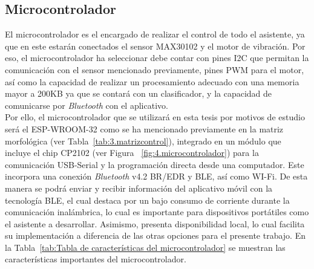 \subsection{Microcontrolador}
    El microcontrolador es el encargado de realizar el control de todo el asistente, ya que en este estarán conectados el sensor MAX30102 y el motor de vibración. Por eso, el microcontrolador ha seleccionar debe contar con pines I2C que permitan la comunicación con el sensor mencionado previamente, pines PWM para el motor, así como la capacidad de realizar un procesamiento adecuado con una memoria mayor a 200KB ya que se contará con un clasificador, y la capacidad de comunicarse por \textit{Bluetooth} con el aplicativo.\\
    
    Por ello, el microcontrolador que se utilizará en esta tesis por motivos de estudio será el ESP-WROOM-32 como se ha mencionado previamente en la matriz morfológica (ver Tabla~\ref{tab:3.matrizcontrol}), integrado en un módulo que incluye el chip CP2102 (ver Figura ~\ref{fig:4.microcontrolador}) para la comunicación USB-Serial y la programación directa desde una computador. Este incorpora una conexión \textit{Bluetooth} v4.2 BR/EDR y BLE, así como WI-Fi. De esta manera se podrá enviar y recibir información del aplicativo móvil con la tecnología \ac{BLE}, el cual destaca por un bajo consumo de corriente durante la comunicación inalámbrica, lo cual es importante para dispositivos portátiles como el asistente a desarrollar. Asimismo, presenta disponibilidad local, lo cual facilita su implementación a diferencia de las otras opciones para el presente trabajo. En la Tabla~\ref{tab:Tabla de características del microcontrolador} se muestran las características importantes del microcontrolador.
    
